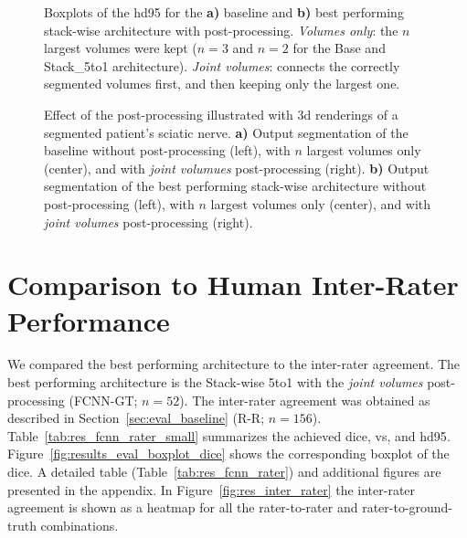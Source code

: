 \begin{figure}[htbp]
	\centering
	\hfill
	\caption[Boxplots of the \acrlong{hd95} for the post-processing]{Boxplots of the \acrlong{hd95} for the \textbf{a)} baseline and \textbf{b)} best performing stack-wise architecture with post-processing.  \textit{Volumes only}: the $n$ largest volumes were kept ($n = 3$ and $n = 2$ for the Base and Stack\_5to1 architecture). \textit{Joint volumes}: connects the correctly segmented volumes first, and then keeping only the largest one.}
	\label{fig:pp_boxplots_hd95}  
\end{figure}


\begin{figure}[htbp]
	\centering
	\hfill
	\subfloat[]
	{
		\label{fig:subfig:pp_5to1_219}
		\texttt{[image: pp\_5to1\_219]}
	}
	\caption[Segmentations Renderings]{Effect of the post-processing illustrated with \gls{3d} renderings of a segmented patient's sciatic nerve. \textbf{a)} Output segmentation of the baseline without post-processing (left), with $n$ largest volumes only (center), and with \textit{joint volumues} post-processing (right). \textbf{b)} Output segmentation of the best performing stack-wise architecture without post-processing (left), with $n$ largest volumes only (center), and with \textit{joint volumes} post-processing (right).}
	\label{fig:pp_patient_219}  
\end{figure}

\section{Comparison to Human Inter-Rater Performance} \label{sec:exp_evaluation} %
We compared the best performing architecture to the inter-rater agreement. The best performing architecture is the Stack-wise 5to1 with the \textit{joint volumes} post-processing (FCNN-GT; $n = 52$). The inter-rater agreement was obtained as described in Section~\ref{sec:eval_baseline} (R-R; $n = 156$).
Table~\ref{tab:res_fcnn_rater_small} summarizes the achieved \acrlong{dice}, \acrlong{vs}, and \acrlong{hd95}. 
Figure~\ref{fig:results_eval_boxplot_dice} shows the corresponding boxplot of the \acrlong{dice}. A detailed table (Table~\ref{tab:res_fcnn_rater}) and additional figures  are presented in the appendix.
In Figure~\ref{fig:res_inter_rater} the inter-rater agreement is shown as a heatmap for all the rater-to-rater and rater-to-ground-truth combinations.

